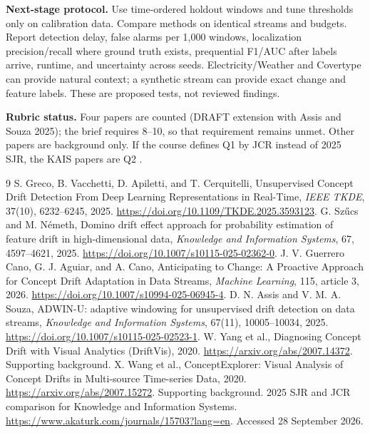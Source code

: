 \documentclass[10pt,a4paper]{article}
\begin{document}
\textbf{Next-stage protocol.} Use time-ordered holdout windows and tune thresholds only on calibration data. Compare methods on identical streams and budgets. Report detection delay, false alarms per 1,000 windows, localization precision/recall where ground truth exists, prequential F1/AUC after labels arrive, runtime, and uncertainty across seeds. Electricity/Weather and Covertype can provide natural context; a synthetic stream can provide exact change and feature labels. These are proposed tests, not reviewed findings.

\textbf{Rubric status.} Four papers are counted (DRAFT extension with Assis and Souza 2025); the brief requires 8--10, so that requirement remains unmet. Other papers are background only. If the course defines Q1 by JCR instead of 2025 SJR, the KAIS papers are Q2 \cite{ranking}.

\begin{thebibliography}{9}\small
{} S. Greco, B. Vacchetti, D. Apiletti, and T. Cerquitelli, Unsupervised Concept Drift Detection From Deep Learning Representations in Real-Time, \emph{IEEE TKDE}, 37(10), 6232--6245, 2025. \url{https://doi.org/10.1109/TKDE.2025.3593123}.
 G. Sz\H{u}cs and M. N\'emeth, Domino drift effect approach for probability estimation of feature drift in high-dimensional data, \emph{Knowledge and Information Systems}, 67, 4597--4621, 2025. \url{https://doi.org/10.1007/s10115-025-02362-0}.
 J. V. Guerrero Cano, G. J. Aguiar, and A. Cano, Anticipating to Change: A Proactive Approach for Concept Drift Adaptation in Data Streams, \emph{Machine Learning}, 115, article 3, 2026. \url{https://doi.org/10.1007/s10994-025-06945-4}.
 D. N. Assis and V. M. A. Souza, ADWIN-U: adaptive windowing for unsupervised drift detection on data streams, \emph{Knowledge and Information Systems}, 67(11), 10005--10034, 2025. \url{https://doi.org/10.1007/s10115-025-02523-1}.
 W. Yang et al., Diagnosing Concept Drift with Visual Analytics (DriftVis), 2020. \url{https://arxiv.org/abs/2007.14372}. Supporting background.
 X. Wang et al., ConceptExplorer: Visual Analysis of Concept Drifts in Multi-source Time-series Data, 2020. \url{https://arxiv.org/abs/2007.15272}. Supporting background.
 2025 SJR and JCR comparison for Knowledge and Information Systems. \url{https://www.akaturk.com/journals/15703?lang=en}. Accessed 28 September 2026.
\end{thebibliography}
\end{document}
